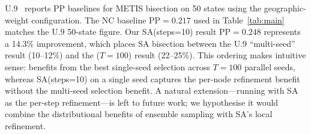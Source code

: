 U.9~\citep{h1paper} reports PP baselines for METIS bisection on 50 states
using the geographic-weight configuration.
The NC baseline PP$= 0.217$ used in Table~\ref{tab:main} matches the U.9
50-state figure.
Our SA(steps=10) result PP$= 0.248$ represents a 14.3\% improvement, which
places SA bisection between the U.9 ``multi-seed'' result (10--12\%)
and the \be{}($T=100$) result (22--25\%).
This ordering makes intuitive sense: \be{} benefits from the best
single-seed selection across $T=100$ parallel seeds, whereas SA(steps=10)
on a single seed captures the per-node refinement benefit without the
multi-seed selection benefit.
A natural extension---running \be{} with SA as the per-step refinement---is
left to future work; we hypothesise it would combine the distributional
benefits of ensemble sampling with SA's local refinement.

